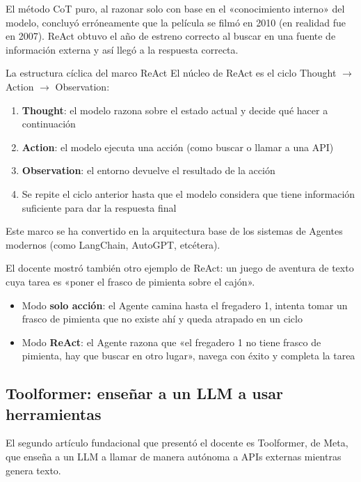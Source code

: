 El método CoT puro, al razonar solo con base en el «conocimiento interno» del modelo, concluyó erróneamente que la película se filmó en 2010 (en realidad fue en 2007). ReAct obtuvo el año de estreno correcto al buscar en una fuente de información externa y así llegó a la respuesta correcta.

\begin{importantbox}{La estructura cíclica del marco ReAct}
El núcleo de ReAct es el ciclo Thought $\rightarrow$ Action $\rightarrow$ Observation:
\begin{enumerate}
    \item \textbf{Thought}: el modelo razona sobre el estado actual y decide qué hacer a continuación
    \item \textbf{Action}: el modelo ejecuta una acción (como buscar o llamar a una API)
    \item \textbf{Observation}: el entorno devuelve el resultado de la acción
    \item Se repite el ciclo anterior hasta que el modelo considera que tiene información suficiente para dar la respuesta final
\end{enumerate}
Este marco se ha convertido en la arquitectura base de los sistemas de Agentes modernos (como LangChain, AutoGPT, etcétera).
\end{importantbox}

El docente mostró también otro ejemplo de ReAct: un juego de aventura de texto cuya tarea es «poner el frasco de pimienta sobre el cajón».

\begin{itemize}
    \item Modo \textbf{solo acción}: el Agente camina hasta el fregadero 1, intenta tomar un frasco de pimienta que no existe ahí y queda atrapado en un ciclo
    \item Modo \textbf{ReAct}: el Agente razona que «el fregadero 1 no tiene frasco de pimienta, hay que buscar en otro lugar», navega con éxito y completa la tarea
\end{itemize}

\subsection{Toolformer: enseñar a un LLM a usar herramientas}

El segundo artículo fundacional que presentó el docente es Toolformer, de Meta, que enseña a un LLM a llamar de manera autónoma a APIs externas mientras genera texto.

